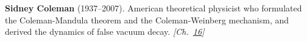 \textbf{Sidney Coleman} (1937–2007). American theoretical physicist who formulated the Coleman-Mandula theorem and the Coleman-Weinberg mechanism, and derived the dynamics of false vacuum decay. \emph{[Ch.~\hyperref[ch:falsevacuumthreat]{16}]}

